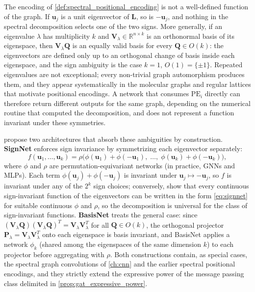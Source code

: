 \begin{remark}\label{rem:ambiguedad_autovectores}
The encoding of \autoref{def:spectral_positional_encoding} is not a well-defined function of the graph. If $\mathbf{u}_j$ is a unit eigenvector of $\mathbf{L}$, so is $-\mathbf{u}_j$, and nothing in the spectral decomposition selects one of the two signs. More generally, if an eigenvalue $\lambda$ has multiplicity $k$ and $\mathbf{V}_\lambda \in \mathbb{R}^{n \times k}$ is an orthonormal basis of its eigenspace, then $\mathbf{V}_\lambda \mathbf{Q}$ is an equally valid basis for every $\mathbf{Q} \in O(k)$: the eigenvectors are defined only up to an orthogonal change of basis inside each eigenspace, and the sign ambiguity is the case $k = 1$, $O(1) = \{\pm 1\}$. Repeated eigenvalues are not exceptional; every non-trivial graph automorphism produces them, and they appear systematically in the molecular graphs and regular lattices that motivate positional encodings. A network that consumes $\text{PE}_i$ directly can therefore return different outputs for the same graph, depending on the numerical routine that computed the decomposition, and does not represent a function invariant under these symmetries.
\end{remark}

\citet{lim2023signnet} propose two architectures that absorb these ambiguities by construction. \textbf{SignNet} enforces sign invariance by symmetrizing each eigenvector separately:
\begin{equation}
    f(\mathbf{u}_1, \ldots, \mathbf{u}_k) = \rho\big(\phi(\mathbf{u}_1) + \phi(-\mathbf{u}_1), \; \ldots, \; \phi(\mathbf{u}_k) + \phi(-\mathbf{u}_k)\big),
    \label{eq:signnet}
\end{equation}
where $\phi$ and $\rho$ are permutation-equivariant networks (in practice, \glspl{GNN} and \glspl{MLP}). Each term $\phi(\mathbf{u}_j) + \phi(-\mathbf{u}_j)$ is invariant under $\mathbf{u}_j \mapsto -\mathbf{u}_j$, so $f$ is invariant under any of the $2^k$ sign choices; conversely, \citet{lim2023signnet} show that every continuous sign-invariant function of the eigenvectors can be written in the form \eqref{eq:signnet} for suitable continuous $\phi$ and $\rho$, so the decomposition is universal for the class of sign-invariant functions. \textbf{BasisNet} treats the general case: since $(\mathbf{V}_\lambda \mathbf{Q})(\mathbf{V}_\lambda \mathbf{Q})^T = \mathbf{V}_\lambda \mathbf{V}_\lambda^T$ for all $\mathbf{Q} \in O(k)$, the orthogonal projector $\mathbf{P}_\lambda = \mathbf{V}_\lambda \mathbf{V}_\lambda^T$ onto each eigenspace is basis invariant, and BasisNet applies a network $\phi_k$ (shared among the eigenspaces of the same dimension $k$) to each projector before aggregating with $\rho$. Both constructions contain, as special cases, the spectral graph convolutions of \autoref{ch:cnn} and the earlier spectral positional encodings, and they strictly extend the expressive power of the message passing class delimited in \autoref{prop:gat_expressive_power}.

